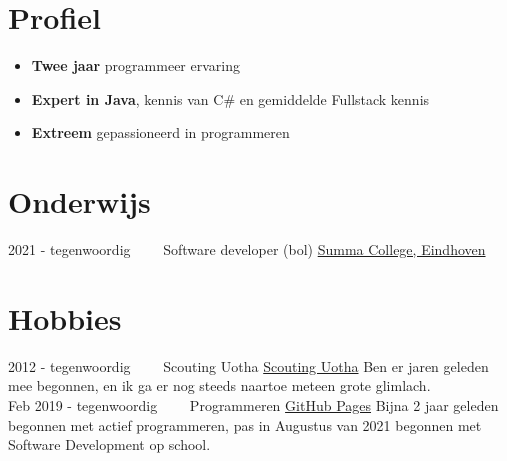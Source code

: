 \documentclass[letterpaper]{twentysecondcv} %
\begin{document}
    \makesidebarFirst %



    \section{Profiel}

    \begin{itemize}
        \item \textbf{Twee jaar} programmeer ervaring
        \item \textbf{Expert in Java}, kennis van C\# en gemiddelde Fullstack kennis
        \item \textbf{Extreem} gepassioneerd in programmeren
    \end{itemize}

    \vspace{6mm}




    \section{Onderwijs}

    \begin{twenty} %
        \twentyitem
        {2021 - tegenwoordig~~~~}
        {}
        {Software developer (bol)}
        {\href{https://www.summacollege.nl/}{Summa College, Eindhoven}}
        {}
        {}
    \end{twenty}



    \section{Hobbies}

    \begin{twenty} %
        \twentyitem
        {2012 -}
        {tegenwoordig~~~~}
        {Scouting Uotha}
        {\href{https://www.uotha.nl/}{Scouting Uotha}}
        {}
        { Ben er jaren geleden mee begonnen, en ik ga er nog steeds naartoe meteen grote glimlach.}\\
        \twentyitem
        {Feb 2019 -}
        {tegenwoordig~~~~}
        {Programmeren}
        {\href{https://tais993.github.io/}{GitHub Pages}}
        {}
        {Bijna 2 jaar geleden begonnen met actief programmeren, pas in Augustus van 2021 begonnen met Software Development op school.}
    \end{twenty}
\end{document}
